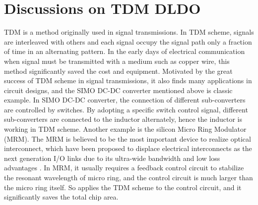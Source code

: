 \documentclass[journal]{IEEEtran}
\begin{document}
\section{Discussions on TDM DLDO}
TDM is a method originally used in signal transmissions. In TDM scheme, signals are interleaved with others and each signal occupy the signal path only a fraction of time in an alternating pattern. In the early days of electrical communication when signal must be transmitted with a medium such as copper wire, this method significantly saved the cost and equipment\cite{TDM}. Motivated by the great success of TDM scheme in signal transmissions, it also finds many applications in circuit designs, and the SIMO DC-DC converter mentioned above is classic example. In SIMO DC-DC converter, the connection of different sub-converters are controlled by switches. By adopting a specific switch control signal, different sub-converters are connected to the inductor alternately, hence the inductor is working in TDM scheme. Another example is the silicon Micro Ring Modulator (MRM). The MRM is believed to be the most important device to realize optical interconnect, which have been proposed to displace electrical interconnects as the next generation I/O links due to its ultra-wide bandwidth and low loss advantages \cite{wangzhicheng}. In MRM, it usually requires a feedback control circuit to stabilize the resonant wavelength of micro ring, and the control circuit is much larger than the micro ring itself. So \cite{wangzhicheng} applies the TDM scheme to the control circuit, and it significantly saves the total chip area.
\end{document}
